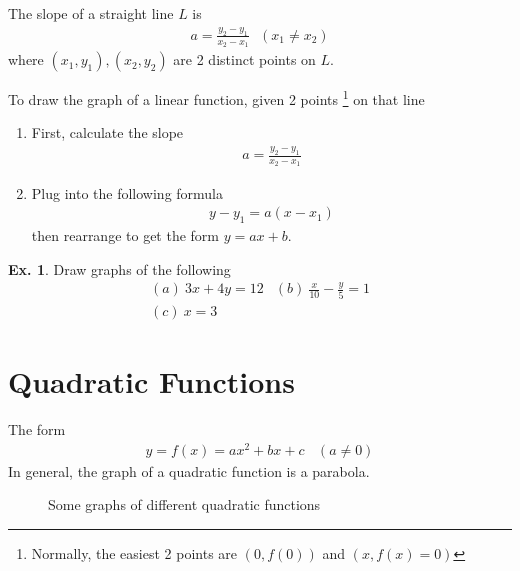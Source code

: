 \documentclass[10pt,a4paper]{book}
\theoremstyle{definition}\newtheorem{definition}{Definition}
\theoremstyle{definition}\newtheorem{fact}{Fact}
\theoremstyle{definition}\newtheorem{ex}{Ex.}
\theoremstyle{definition}\newtheorem{project}{Project}
\theoremstyle{definition}\newtheorem{problem}{Problem}
\theoremstyle{definition}\newtheorem{example}{Example}
\numberwithin{theorem}{chapter}
\numberwithin{corollary}{chapter}
\numberwithin{assumption}{chapter}
\numberwithin{definition}{chapter}
\numberwithin{prop}{chapter}
\numberwithin{notation}{chapter}
\numberwithin{problem}{chapter}
\numberwithin{example}{chapter}
\numberwithin{fact}{chapter}
\numberwithin{ex}{chapter}
\begin{document}
	The slope of a straight line $L$ is
	\begin{align*}
		a = \frac{y_2 - y_1}{x_2 - x_1} \ \ \ (x_1 \neq x_2) 
	\end{align*}
	where $(x_1, y_1), (x_2, y_2)$ are 2 distinct points on $L$.
	
	To draw the graph of a linear function, given 2 points \footnote{Normally, the easiest 2 points are $(0, f(0))$ and $(x, f(x)=0)$} on that line
	\begin{enumerate}
		\item First, calculate the slope
		\begin{align*}
			a = \frac{y_2 - y_1}{x_2 - x_1} 
		\end{align*}
		\item Plug into the following formula
		\begin{align*}
			y - y_1 = a(x-x_1) 
		\end{align*}
		then rearrange to get the form $y=ax+b$.
	\end{enumerate}
	
	\begin{ex}
		Draw graphs of the following
		\begin{align*}
			& (a) \ 3x + 4y = 12 &(b) \ \frac{x}{10} - \frac{y}{5} = 1 &                                      \\
			& (c) \ x = 3          &                                      
		\end{align*}
	\end{ex}
	
	\section{Quadratic Functions}
	The form
	\begin{align*}
		y = f(x) = ax^2 + bx + c \ \ \ \ (a\neq 0) 
	\end{align*}
	In general, the graph of a quadratic function is a parabola.
	
	\begin{figure}[ht]
		\caption{Some graphs of different quadratic functions}
	\end{figure}
	
\end{document}

